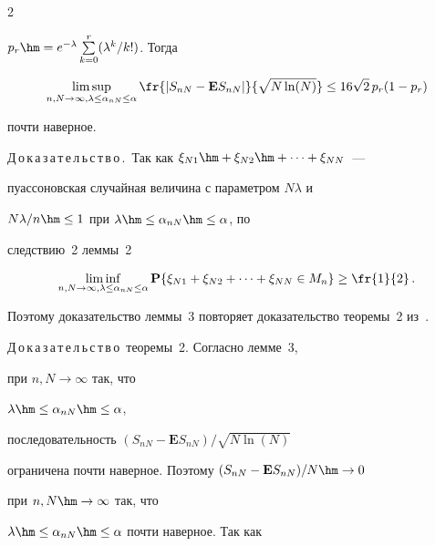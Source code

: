 \begin{multicols}{2}
{$p_r\hm=e^{-\lambda}\sum\limits_{k=0}^r({\lambda^k}/{k!}) $.  Тогда


$$


\limsup\limits_{n, N\to\infty,


\lambda\le\alpha_{nN}\le\alpha}\fr{|S_{nN}-


\mathbf{E}S_{nN}|}{\sqrt{N\ln(N)}}\le 16\sqrt{2}\,p_r(1-p_r)


$$


почти наверное.}





\medskip





\noindent


Д\,о\,к\,а\,з\,а\,т\,е\,л\,ь\,с\,т\,в\,о\,.\ Так как $\xi_{N1}\hm+\xi_{N2}\hm+ \dots +\xi_{NN}$~--- 


пуассоновская случайная величина с параметром $N\lambda$  и


${N\lambda}/{n}\hm\le 1 $ при $\lambda\hm\le\alpha_{nN}\hm\le\alpha$, по


следствию~2 леммы~2


$$


\liminf_{n, N\to\infty,


\lambda\le\alpha_{nN}\le\alpha} \mathbf{P}\{


 \xi_{N1}+\xi_{N2}+ \dots +\xi_{NN}\in M_n\}\ge\fr{1}{2}\,.


$$


Поэтому доказательство леммы~3 повторяет доказательство теоремы~2 из~\cite{6-chu}.





\medskip





\noindent


Д\,о\,к\,а\,з\,а\,т\,е\,л\,ь\,с\,т\,в\,о\ теоремы~2. Согласно лемме~3, 


при $n, N\to\infty$ так, что


$\lambda\hm\le\alpha_{nN}\hm\le \alpha$,


 последовательность $({S_{nN}-\mathbf{E}S_{nN}})/{\sqrt{N\ln(N)}}$


ограничена почти наверное. Поэтому $({S_{nN}-\mathbf{E}S_{nN}})/N\hm\to 0$ 


при $n, N\hm\to\infty$ так, что


$\lambda\hm\le\alpha_{nN}\hm\le\alpha$ почти наверное. Так как



\end{multicols}
